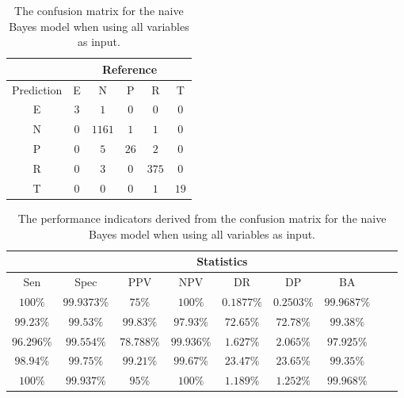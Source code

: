 \begin{table}[!ht]
	\centering
	\begin{tabular}{|c|c|c|c|c|c|}
		\hline
		 & \multicolumn{5}{|c|}{Reference} \\ \hline
		 Prediction & E & N & P & R & T \\ \hline
		 E & $3$ & $1$ & $0$ & $0$ & $0$ \\ \hline
		 N & $0$ & $1161$ & $1$ & $1$ & $0$ \\ \hline
		 P & $0$ & $5$ & $26$ & $2$ & $0$ \\ \hline
		 R & $0$ & $3$ & $0$ & $375$ & $0$ \\ \hline
		 T & $0$ & $0$ & $0$ & $1$ & $19$ \\ \hline
	\end{tabular}
	\caption{The confusion matrix for the naive Bayes model when using all variables as input.}
	\label{tab:cm:all:nb}
\end{table}

\begin{table}[!ht]
	\centering
	\begin{tabular}{|c|c|c|c|c|c|c|c|c|}
		\hline
		 & \multicolumn{7}{c|}{Statistics} \\ \hline
		Sen & Spec & PPV & NPV & DR & DP & BA \\ \hline
		$100\%$ & $99.9373\%$ & $75\%$ & $100\%$ & $0.1877\%$ & $0.2503\%$ & $99.9687\%$ \\ \hline
		$99.23\%$ & $99.53\%$ & $99.83\%$ & $97.93\%$ & $72.65\%$ & $72.78\%$ & $99.38\%$ \\ \hline
		$96.296\%$ & $99.554\%$ & $78.788\%$ & $99.936\%$ & $1.627\%$ & $2.065\%$ & $97.925\%$ \\ \hline
		$98.94\%$ & $99.75\%$ & $99.21\%$ & $99.67\%$ & $23.47\%$ & $23.65\%$ & $99.35\%$ \\ \hline
		$100\%$ & $99.937\%$ & $95\%$ & $100\%$ & $1.189\%$ & $1.252\%$ & $99.968\%$ \\ \hline
	\end{tabular}
	\caption{The performance indicators derived from the confusion matrix for the naive Bayes model when using all variables as input.}
	\label{tab:cs:all:nb}
\end{table}

